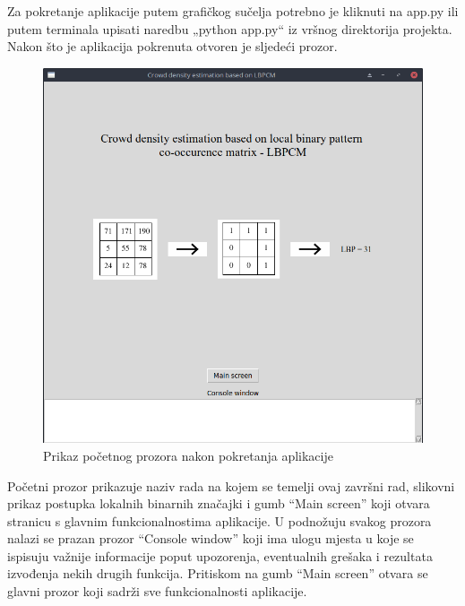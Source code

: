 \documentclass[times, utf8, zavrsni, numeric]{fer}
\begin{document}
Za pokretanje aplikacije putem grafičkog sučelja potrebno je kliknuti 
na app.py ili putem terminala upisati naredbu „python app.py“ iz 
vršnog direktorija projekta. Nakon što je aplikacija pokrenuta 
otvoren je sljedeći prozor. 

\begin{figure}[ht]
\centering
\includegraphics[scale=0.35]{img/startpage.png}
\caption{Prikaz početnog prozora nakon pokretanja aplikacije}
\end{figure}

\newpage

Početni prozor prikazuje naziv rada \citep{6266412} na kojem se temelji ovaj završni rad, 
slikovni prikaz postupka lokalnih binarnih značajki i gumb \enquote{Main screen}
koji otvara stranicu s glavnim funkcionalnostima aplikacije. U podnožuju svakog
prozora nalazi se prazan prozor \enquote{Console window} koji ima ulogu
mjesta u koje se ispisuju važnije informacije poput upozorenja, eventualnih 
grešaka i rezultata izvođenja nekih drugih funkcija. Pritiskom na gumb \enquote{Main screen}
otvara se glavni prozor koji sadrži sve funkcionalnosti aplikacije.
\end{document}
